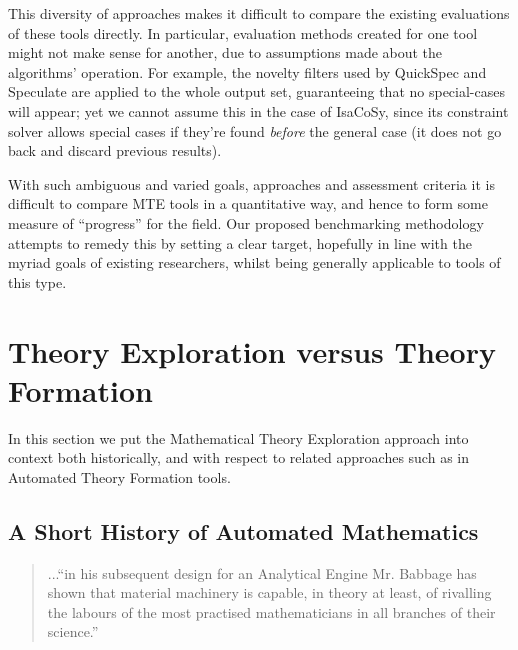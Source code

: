 This diversity of approaches makes it difficult to compare the existing
evaluations of these tools directly. In particular, evaluation methods created
for one tool might not make sense for another, due to assumptions made about
the algorithms' operation. For example, the novelty filters used by QuickSpec
and Speculate are applied to the whole output set, guaranteeing that no
special-cases will appear; yet we cannot assume this in the case of IsaCoSy,
since its constraint solver allows special cases if they're found \emph{before}
the general case (it does not go back and discard previous results).

With such ambiguous and varied goals, approaches and assessment criteria it is
difficult to compare MTE tools in a quantitative way, and hence to form some
measure of ``progress'' for the field. Our proposed benchmarking methodology
attempts to remedy this by setting a clear target, hopefully in line with the
myriad goals of existing researchers, whilst being generally applicable to
tools of this type.

\section{Theory Exploration versus Theory
  Formation}\label{exploration-versus-formation}

In this section we put the Mathematical Theory Exploration approach
into context both historically, and with respect to related approaches
such as in Automated Theory Formation tools.

\subsection{A Short History of Automated Mathematics}

\begin{quote}
...``in his subsequent design for an Analytical Engine Mr. Babbage has
shown that material machinery is capable, in theory at least, of
rivalling the labours of the most practised mathematicians in all
branches of their science.''~\cite[p. 498]{jevons}
\end{quote}

